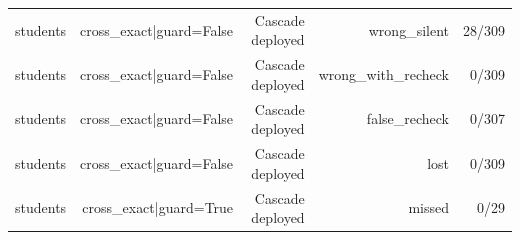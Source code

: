 \begin{table}[t]
{\begin{tabular}{@{}lrrrr@{}}
students & cross\_exact|guard=False & Cascade deployed & wrong\_silent & 28/309 \\
students & cross\_exact|guard=False & Cascade deployed & wrong\_with\_recheck & 0/309 \\
students & cross\_exact|guard=False & Cascade deployed & false\_recheck & 0/307 \\
students & cross\_exact|guard=False & Cascade deployed & lost & 0/309 \\
students & cross\_exact|guard=True & Cascade deployed & missed & 0/29 \\
\bottomrule
\end{tabular}
}
\end{table}

